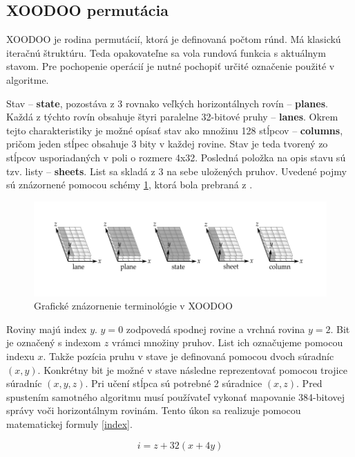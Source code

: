 \subsection{XOODOO permutácia}
XOODOO je rodina permutácií, ktorá je definovaná počtom rúnd. Má klasickú iteračnú štruktúru. Teda opakovateľne sa vola rundová funkcia s aktuálnym stavom. Pre pochopenie operácií je nutné pochopiť určité označenie použité v algoritme.

Stav -- \textbf{state}, pozostáva z 3 rovnako veľkých horizontálnych rovín -- \textbf{planes}. Každá z týchto rovín obsahuje štyri paralelne 32-bitové pruhy -- \textbf{lanes}. Okrem tejto charakteristiky je možné opísať stav ako množinu 128 stĺpcov -- \textbf{columns}, pričom jeden stĺpec obsahuje 3 bity v každej rovine. Stav je teda tvorený zo stĺpcov usporiadaných v poli o rozmere 4x32. Posledná položka na opis stavu sú tzv. listy -- \textbf{sheets}. List sa skladá z 3 na sebe uložených pruhov. Uvedené pojmy sú znázornené pomocou schémy \ref{xoodooterm}, ktorá bola prebraná z \cite{xcb}.

\begin{figure}[!h]
	\centering
	\includegraphics[width=1\textwidth]{figures/xoodooTerminology}
	\caption{Grafické znázornenie terminológie v XOODOO}
	\label{xoodooterm}
\end{figure}

Roviny majú index $y$. $y=0$ zodpovedá spodnej rovine a vrchná rovina $y=2$. Bit je označený s indexom $z$ vrámci množiny pruhov. List ich označujeme pomocou indexu $x$. Takže pozícia pruhu v stave je definovaná pomocou dvoch súradníc $(x,y)$. Konkrétny bit je možné v stave následne reprezentovať pomocou trojice súradníc $(x,y,z)$. Pri učení stĺpca sú potrebné 2 súradnice $(x,z)$. Pred spustením samotného algoritmu musí používateľ vykonať mapovanie 384-bitovej správy voči horizontálnym rovinám. Tento úkon sa realizuje pomocou matematickej formuly \ref{index}.

\begin{equation}\label{index}
	i=z+32(x+4y)
\end{equation}

